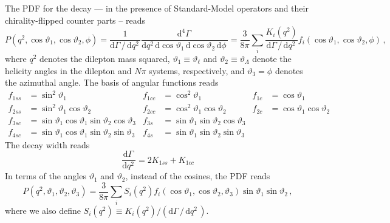\documentclass[aps,prd,reprint,nofootinbib,preprintnumbers]{revtex4}
\newcommand{\rmdx}[1]{\mbox{d} #1 \,} %
\renewcommand{\theta}{\vartheta}
\begin{document}
The PDF for the decay --- in the presence of Standard-Model operators and their chirality-flipped counter parts -- reads \cite{Boeer:2014xx}
\begin{equation}
    P(q^2, \cos\theta_1, \cos\theta_2, \phi) = \frac{1}{\rmdx{\Gamma} /\, \rmdx{q^2}} \frac{\rmdx{^4\Gamma}}{\rmdx{q^2} \rmdx{\cos\theta_1} \rmdx{\cos\theta_2} \rmdx{\phi}} = \frac{3}{8\pi} \sum_i \frac{K_{i}(q^2)}{\rmdx{\Gamma} /\, \rmdx{q^2}} f_i(\cos\theta_1, \cos\theta_2, \phi)\,,
\end{equation}
where $q^2$ denotes the dilepton mass squared, $\theta_1 \equiv \theta_\ell$ and $\theta_2 \equiv \theta_\Lambda$ denote the
helicity angles in the dilepton and
$N\pi$ systems, respectively, and $\theta_3 = \phi$ denotes the azimuthal angle.
The basis of angular functions reads \cite{Boeer:2014xx}
\begin{equation}
    \begin{aligned}
        f_{1ss} & = \sin^2\theta_1 &
        f_{1cc} & = \cos^2\theta_1 &
        f_{1c}  & = \cos\theta_1\\
        f_{2ss} & = \sin^2\theta_1 \cos\theta_2 &
        f_{2cc} & = \cos^2\theta_1 \cos\theta_2 &
        f_{2c}  & = \cos\theta_1   \cos\theta_2 \\
        f_{3sc} & = \sin\theta_1 \cos\theta_1 \sin\theta_2 \cos\theta_3 &
        f_{3s}  & = \sin\theta_1              \sin\theta_2 \cos\theta_3 \\
        f_{4sc} & = \sin\theta_1 \cos\theta_1 \sin\theta_2 \sin\theta_3 &
        f_{4s}  & = \sin\theta_1              \sin\theta_2 \sin\theta_3
    \end{aligned}
\end{equation}
The decay width reads
\begin{equation}
    \frac{\rmdx{\Gamma}} {\rmdx{q^2}} = 2 K_{1ss} + K_{1cc}
\end{equation}
In terms of the angles $\theta_1$ and $\theta_2$, instead of the cosines, the PDF reads
\begin{equation}
    P(q^2, \theta_1, \theta_2, \theta_3) = \frac{3}{8\pi} \sum_i S_i(q^2) f_i(\cos\theta_1, \cos\theta_2, \theta_3) \sin\theta_1 \sin\theta_2\,,
\end{equation}
where we also define $S_i(q^2) \equiv K_i(q^2) / (\rmdx{\Gamma} /\, \rmdx{q^2})$.\\
\end{document}
